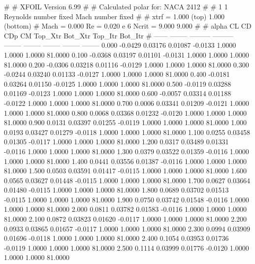 #  
#       XFOIL         Version 6.99
#  
# Calculated polar for: NACA 2412                                       
#  
# 1 1 Reynolds number fixed          Mach number fixed         
#  
# xtrf =   1.000 (top)        1.000 (bottom)  
# Mach =   0.000     Re =     0.020 e 6     Ncrit =   9.000  9.000
#  
#   alpha    CL        CD       CDp       CM     Top_Xtr  Bot_Xtr  Top_Itr  Bot_Itr
#  ------ -------- --------- --------- -------- -------- -------- -------- --------
   0.000  -0.0429   0.03176   0.01087  -0.0133   1.0000   1.0000   1.0000  81.0000
   0.100  -0.0368   0.03197   0.01101  -0.0131   1.0000   1.0000   1.0000  81.0000
   0.200  -0.0306   0.03218   0.01116  -0.0129   1.0000   1.0000   1.0000  81.0000
   0.300  -0.0244   0.03240   0.01133  -0.0127   1.0000   1.0000   1.0000  81.0000
   0.400  -0.0181   0.03264   0.01150  -0.0125   1.0000   1.0000   1.0000  81.0000
   0.500  -0.0119   0.03288   0.01169  -0.0123   1.0000   1.0000   1.0000  81.0000
   0.600  -0.0057   0.03314   0.01188  -0.0122   1.0000   1.0000   1.0000  81.0000
   0.700   0.0006   0.03341   0.01209  -0.0121   1.0000   1.0000   1.0000  81.0000
   0.800   0.0068   0.03368   0.01232  -0.0120   1.0000   1.0000   1.0000  81.0000
   0.900   0.0131   0.03397   0.01255  -0.0119   1.0000   1.0000   1.0000  81.0000
   1.000   0.0193   0.03427   0.01279  -0.0118   1.0000   1.0000   1.0000  81.0000
   1.100   0.0255   0.03458   0.01305  -0.0117   1.0000   1.0000   1.0000  81.0000
   1.200   0.0317   0.03489   0.01331  -0.0116   1.0000   1.0000   1.0000  81.0000
   1.300   0.0379   0.03522   0.01359  -0.0116   1.0000   1.0000   1.0000  81.0000
   1.400   0.0441   0.03556   0.01387  -0.0116   1.0000   1.0000   1.0000  81.0000
   1.500   0.0503   0.03591   0.01417  -0.0115   1.0000   1.0000   1.0000  81.0000
   1.600   0.0565   0.03627   0.01448  -0.0115   1.0000   1.0000   1.0000  81.0000
   1.700   0.0627   0.03664   0.01480  -0.0115   1.0000   1.0000   1.0000  81.0000
   1.800   0.0689   0.03702   0.01513  -0.0115   1.0000   1.0000   1.0000  81.0000
   1.900   0.0750   0.03742   0.01548  -0.0116   1.0000   1.0000   1.0000  81.0000
   2.000   0.0811   0.03782   0.01583  -0.0116   1.0000   1.0000   1.0000  81.0000
   2.100   0.0872   0.03823   0.01620  -0.0117   1.0000   1.0000   1.0000  81.0000
   2.200   0.0933   0.03865   0.01657  -0.0117   1.0000   1.0000   1.0000  81.0000
   2.300   0.0994   0.03909   0.01696  -0.0118   1.0000   1.0000   1.0000  81.0000
   2.400   0.1054   0.03953   0.01736  -0.0119   1.0000   1.0000   1.0000  81.0000
   2.500   0.1114   0.03999   0.01776  -0.0120   1.0000   1.0000   1.0000  81.0000
